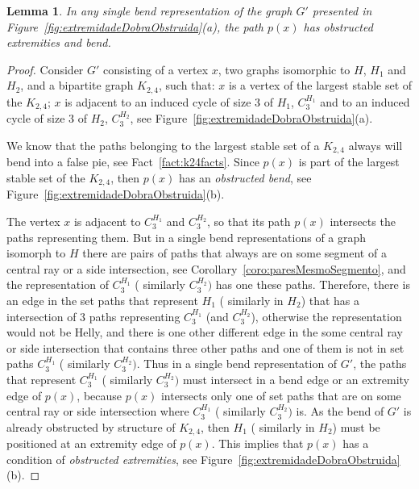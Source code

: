 \documentclass[preprint,12pt]{elsarticle} %
\newtheorem{lema}[theorem]{Lemma}
\begin{document}
\begin{lema}\label{lem:obstrucao}
In any single bend representation of the graph $G'$ presented in Figure~\ref{fig:extremidadeDobraObstruida}(a), the path $p(x)$ has obstructed extremities and bend.

\end{lema}

\begin{proof}
Consider $G'$ consisting of a vertex $x$, two graphs isomorphic to $H$, $ H_1 $ and $ H_2 $, and a bipartite graph $K_{2,4}$, such that: $x$ is a vertex of the largest stable set of the $K_{2,4}$; $x$ is adjacent to an induced cycle of size 3 of $H_1$, $C_3^{H_1}$ and to an induced cycle of size 3 of $H_2$, $ C_3^{H_2}$, see Figure~\ref{fig:extremidadeDobraObstruida}(a). %

We know that the paths belonging to the largest stable set of a $K_{2,4}$ always will bend into a false pie, see Fact~\ref{fact:k24facts}. Since $p(x)$ is part of the largest stable set of the $K_{2,4}$, then $p(x)$ has an \emph {obstructed bend}, see Figure~\ref{fig:extremidadeDobraObstruida}(b). 

The vertex $x$ is adjacent to $ C_{3}^{H_1}$ and $ C_3^{H_2}$, so that its path $ p(x) $ intersects the paths representing them.  But in a single bend representations of a graph isomorph to $H$ there are pairs of paths that always are on some segment of a central ray or a side intersection, see Corollary~\ref{coro:paresMesmoSegmento}, and the representation of $C_{3}^{H_1}$ ( similarly $C_3^{H_2})$ has one these paths. Therefore, there is an edge in the set paths that represent ${H_1}$ ( similarly in ${H_2}$) that has a intersection of 3 paths representing $ C_{3}^{H_1}$ (and $ C_3^{H_2}$), otherwise the representation would not be Helly, and there is one other different edge in the some central ray or side intersection that contains three other paths and one of them is not in set paths  $C_{3}^{H_1}$ ( similarly $C_3^{H_2})$. Thus in a single bend representation of $G'$, the paths that represent  $C_{3}^{H_1}$ ( similarly $C_3^{H_2})$ must intersect in a bend edge or an extremity edge of $p(x)$, because $p(x)$ intersects only one of set paths that are on some central ray or side intersection where  $C_{3}^{H_1}$ ( similarly $C_3^{H_2})$ is. As the bend of $G'$ is already obstructed by structure of $K_{2,4}$, then ${H_1}$ ( similarly in ${H_2}$) must be positioned at an extremity edge of $p(x)$. This implies that $ p(x) $ has a condition of \emph{obstructed extremities}, see Figure~\ref{fig:extremidadeDobraObstruida}(b).



\end{proof}
\end{document}
